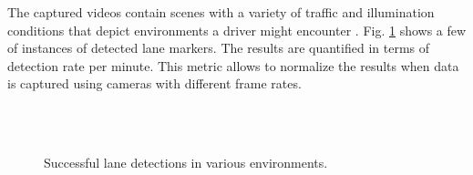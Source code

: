 \documentclass{article}
\begin{document}
The captured videos contain scenes with a variety of traffic and illumination conditions that depict environments a driver might encounter \cite{borkar_layered_2009}. Fig. \ref{fig:lane_detection} shows a few of instances of detected lane markers.
The results are quantified in terms of detection rate per minute. This metric allows to normalize the results when data is captured using cameras with different frame rates.
\begin{figure}[htb!]
  \centering
  \hspace{0.00001in}
  \\
  \hspace{0.00001in}
  \\
  \caption{Successful lane detections in various environments.}
  \label{fig:lane_detection}
\end{figure}
\end{document}
